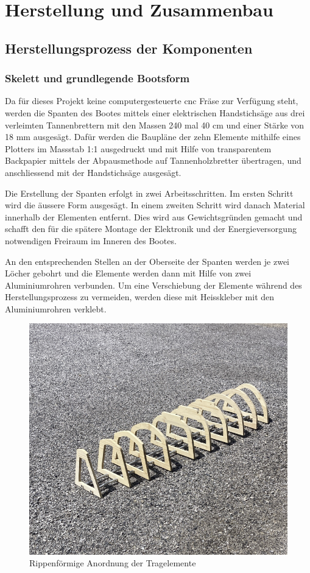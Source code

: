 

\chapter{Herstellung und Zusammenbau}
\label{chap:herstllung}

\section{Herstellungsprozess der Komponenten}
\subsection{Skelett und grundlegende Bootsform}
Da für dieses Projekt keine computergesteuerte \ac{cnc} Fräse zur Verfügung steht, werden die Spanten des Bootes mittels einer elektrischen Handstichsäge aus drei verleimten Tannenbrettern mit den Massen 240 mal 40 cm und einer Stärke von 18 mm ausgesägt. Dafür werden die Baupläne der zehn Elemente mithilfe eines Plotters im Massstab 1:1 ausgedruckt und  mit Hilfe von transparentem Backpapier mittels der Abpausmethode auf Tannenholzbretter übertragen, und anschliessend mit der Handstichsäge ausgesägt.

Die Erstellung der Spanten erfolgt in zwei Arbeitsschritten. Im ersten Schritt wird die äussere Form ausgesägt. In einem zweiten Schritt wird danach Material innerhalb der Elementen entfernt. Dies wird aus Gewichtsgründen gemacht und schafft den für die spätere Montage der Elektronik und der Energieversorgung notwendigen Freiraum im Inneren des Bootes.

An den entsprechenden Stellen an der Oberseite der Spanten werden je zwei Löcher gebohrt und die Elemente werden dann mit Hilfe von zwei Aluminiumrohren verbunden. Um eine Verschiebung der Elemente während des Herstellungsprozess zu vermeiden, werden diese mit Heisskleber mit den Aluminiumrohren verklebt. 
\begin{figure}[H]
    \centering
    \includegraphics[width=1\linewidth]{rippe1.png}
    \caption{Rippenförmige Anordnung der Tragelemente}
    \label{fig:enter-label}
\end{figure}

